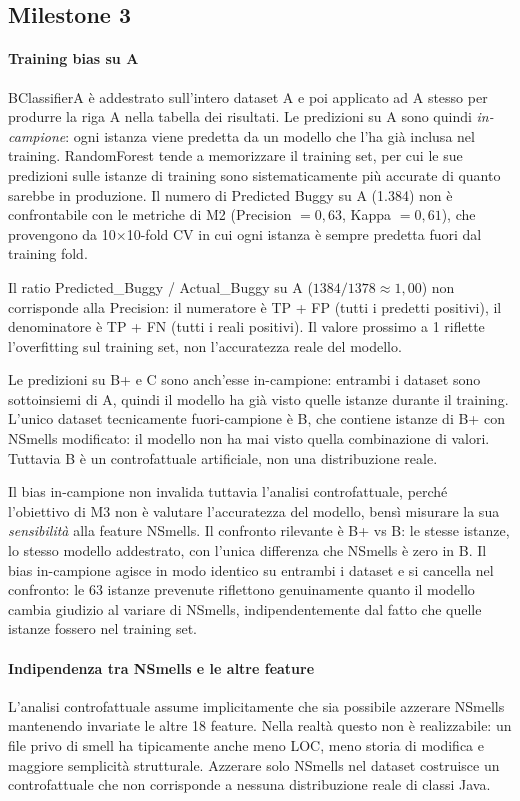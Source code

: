 \subsection{Milestone 3}

\paragraph{Training bias su A}
BClassifierA è addestrato sull'intero dataset A e poi applicato ad A stesso per
produrre la riga A nella tabella dei risultati. Le predizioni su A sono quindi
\textit{in-campione}: ogni istanza viene predetta da un modello che l'ha già inclusa
nel training. RandomForest tende a memorizzare il training set, per cui le sue
predizioni sulle istanze di training sono sistematicamente più accurate di quanto
sarebbe in produzione. Il numero di Predicted Buggy su A (1.384) non è confrontabile
con le metriche di M2 (Precision $= 0{,}63$, Kappa $= 0{,}61$), che provengono da
10$\times$10-fold CV in cui ogni istanza è sempre predetta fuori dal training fold.

Il ratio Predicted\_Buggy / Actual\_Buggy su A ($1384/1378 \approx 1{,}00$) non
corrisponde alla Precision: il numeratore è TP + FP (tutti i predetti positivi), il
denominatore è TP + FN (tutti i reali positivi). Il valore prossimo a 1 riflette
l'overfitting sul training set, non l'accuratezza reale del modello.

Le predizioni su B+ e C sono anch'esse in-campione: entrambi i dataset sono
sottoinsiemi di A, quindi il modello ha già visto quelle istanze durante il training.
L'unico dataset tecnicamente fuori-campione è B, che contiene istanze di B+ con
NSmells modificato: il modello non ha mai visto quella combinazione di valori.
Tuttavia B è un controfattuale artificiale, non una distribuzione reale.

Il bias in-campione non invalida tuttavia l'analisi controfattuale, perché l'obiettivo
di M3 non è valutare l'accuratezza del modello, bensì misurare la sua
\textit{sensibilità} alla feature NSmells. Il confronto rilevante è B+ vs B: le
stesse istanze, lo stesso modello addestrato, con l'unica differenza che NSmells è
zero in B. Il bias in-campione agisce in modo identico su entrambi i dataset e si
cancella nel confronto: le 63 istanze prevenute riflettono genuinamente quanto il
modello cambia giudizio al variare di NSmells, indipendentemente dal fatto che
quelle istanze fossero nel training set.

\paragraph{Indipendenza tra NSmells e le altre feature}
L'analisi controfattuale assume implicitamente che sia possibile azzerare NSmells
mantenendo invariate le altre 18 feature. Nella realtà questo non è realizzabile:
un file privo di smell ha tipicamente anche meno LOC, meno storia di modifica e
maggiore semplicità strutturale. Azzerare solo NSmells nel dataset costruisce un
controfattuale che non corrisponde a nessuna distribuzione reale di classi Java.

